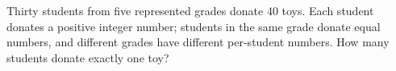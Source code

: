 Thirty students from five represented grades donate 40 toys. Each student donates a positive integer number; students in the same grade donate equal numbers, and different grades have different per-student numbers. How many students donate exactly one toy?

